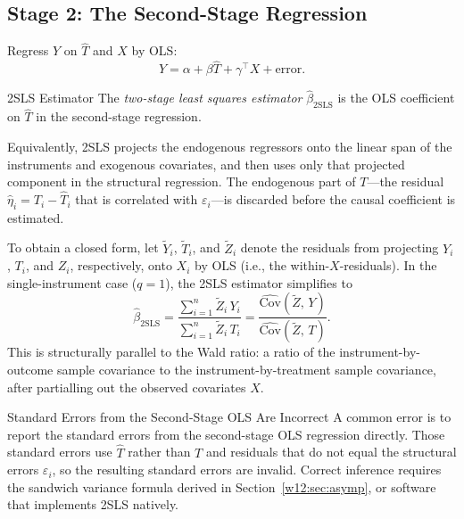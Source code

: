 \documentclass[master.tex]{subfiles}
\begin{document}
\subsection{Stage 2: The Second-Stage Regression}

Regress $Y$ on $\hat{T}$ and $X$ by OLS:
\[
  Y = \alpha + \beta \hat{T} + \gamma^\top X + \text{error}.
\]

\begin{defn}{2SLS Estimator}
\label{w12:defn:2sls}
The \emph{two-stage least squares estimator} $\hat\beta_{\mathrm{2SLS}}$
is the OLS coefficient on $\hat{T}$ in the second-stage regression.
\end{defn}

Equivalently, 2SLS projects the endogenous regressors onto the linear
span of the instruments and exogenous covariates, and then uses only
that projected component in the structural regression.  The
endogenous part of $T$---the residual $\hat\eta_i = T_i -
\hat{T}_i$ that is correlated with $\varepsilon_i$---is discarded
before the causal coefficient is estimated.

To obtain a closed form, let $\tilde{Y}_i$, $\tilde{T}_i$, and
$\tilde{Z}_i$ denote the residuals from projecting $Y_i$, $T_i$, and
$Z_i$, respectively, onto $X_i$ by OLS (i.e., the within-$X$-residuals).
In the single-instrument case ($q = 1$), the 2SLS estimator simplifies to
\begin{equation}
  \hat\beta_{\mathrm{2SLS}}
  = \frac{\sum_{i=1}^n \tilde{Z}_i\, Y_i}
         {\sum_{i=1}^n \tilde{Z}_i\, T_i}
  = \frac{\widehat{\mathrm{Cov}}(\tilde{Z},\, Y)}
         {\widehat{\mathrm{Cov}}(\tilde{Z},\, T)}.
  \label{w12:eq:2sls-closed}
\end{equation}
This is structurally parallel to the Wald ratio: a ratio of
the instrument-by-outcome sample covariance to the
instrument-by-treatment sample covariance, after partialling out the
observed covariates $X$.

\begin{warn}{Standard Errors from the Second-Stage OLS Are Incorrect}
A common error is to report the standard errors from the second-stage
OLS regression directly.  Those standard errors use $\hat{T}$ rather
than $T$ and residuals that do not equal the structural errors
$\varepsilon_i$, so the resulting standard errors are invalid.
Correct inference requires the sandwich variance formula derived in
Section~\ref{w12:sec:asymp}, or software that implements 2SLS natively.
\end{warn}
\end{document}
